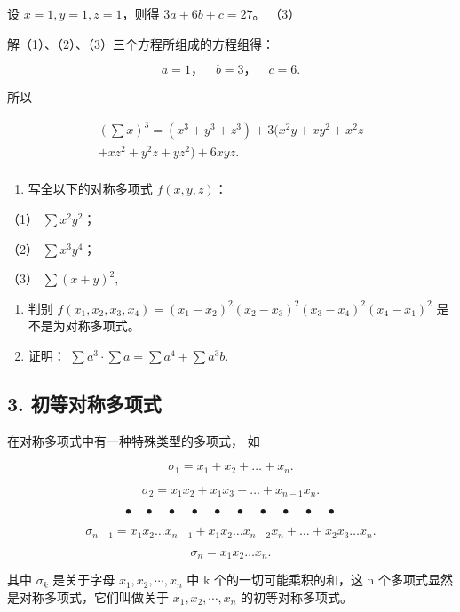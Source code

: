 设 \(x = 1, y = 1, z = 1\)，则得 \(3a + 6b + c = 27\)。 （3）

解（1）、（2）、（3）三个方程所组成的方程组得：

\[
a = 1\text{，} \quad b = 3\text{，} \quad c = 6.
\]

所以

\[
\begin{array}{l} (\sum x) ^ {3} = (x ^ {3} + y ^ {3} + z ^ {3}) + 3 (x ^ {2} y + x y ^ {2} + x ^ {2} z \\ + x z ^ {2} + y ^ {2} z + y z ^ {2}) + 6 x y z. \\ \end{array}
\]

\begin{enumerate}
\item
  写全以下的对称多项式 \(f(x, y, z)\)：
\end{enumerate}

（1） \(\sum x^{2}y^{2}\)；

（2） \(\sum x^{3}y^{4}\)；

（3） \(\sum (x + y)^2,\)

\begin{enumerate}[start=2]
\item
  判别
  \(f(x_1, x_2, x_3, x_4) = (x_1 - x_2)^2 (x_2 - x_3)^2 (x_3 - x_4)^2 (x_4 - x_1)^2\)
  是不是为对称多项式。
\item
  证明： \(\sum a^3\cdot \sum a = \sum a^4 +\sum a^3 b.\)
\end{enumerate}

\subsection{3. 初等对称多项式}

在对称多项式中有一种特殊类型的多项式， 如

\[
\sigma_ {1} = x _ {1} + x _ {2} + \dots + x _ {n}.
\]

\[
\sigma_ {2} = x _ {1} x _ {2} + x _ {1} x _ {3} + \dots + x _ {n - 1} x _ {n}.
\]

\[
\bullet \quad \bullet \quad \bullet \quad \bullet \quad \bullet \quad \bullet \quad \bullet \quad \bullet \quad \bullet \quad \bullet \tag {1}
\]

\[
\sigma_ {n - 1} = x _ {1} x _ {2} \dots x _ {n - 1} + x _ {1} x _ {2} \dots x _ {n - 2} x _ {n} + \dots + x _ {2} x _ {3} \dots x _ {n}.
\]

\[
\sigma_ {n} = x _ {1} x _ {2} \dots x _ {n}.
\]

其中 \(\sigma_{k}\) 是关于字母 \(x_{1}, x_{2}, \cdots, x_{n}\) 中 k
个的一切可能乘积的和，这 n 个多项式显然是对称多项式，它们叫做关于
\(x_{1}, x_{2}, \cdots, x_{n}\) 的初等对称多项式。

